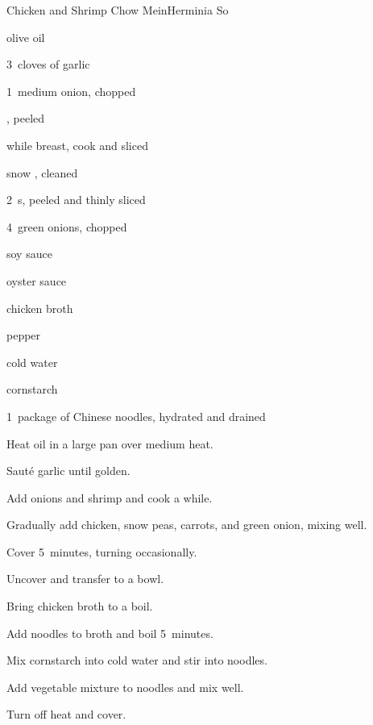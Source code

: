 \begin{recipe}{Chicken and Shrimp Chow Mein}{Herminia So}{}

\begin{ingredients}
\item \C{\quarter} olive oil
\item 3~cloves of garlic
\item 1~medium onion, chopped
\item {} , peeled
\item while  breast, cook and sliced
\item {} snow , cleaned
\item 2~s, peeled and thinly sliced
\item 4~green onions, chopped
\item {} soy sauce
\item {} oyster sauce
\item {} chicken broth
\item \tp{\half} pepper
\item \Tp{1\half} cold water
\item {} cornstarch
\item 1~package of Chinese noodles, hydrated and drained
\end{ingredients}

\begin{directions}
\item Heat oil in a large pan over medium heat.
\item Saut\'e garlic until golden.
\item Add onions and shrimp and cook a while.
\item Gradually add chicken, snow peas, carrots, and green onion, mixing well.
\item Cover 5~minutes, turning occasionally.
\item Uncover and transfer to a bowl.
\item Bring chicken broth to a boil.
\item Add noodles to broth and boil 5~minutes.
\item Mix cornstarch into cold water and stir into noodles.
\item Add vegetable mixture to noodles and mix well.
\item Turn off heat and cover.
\end{directions}

\end{recipe}
